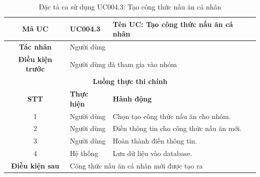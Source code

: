 \begin{table}[H]
    \centering
    \label{tab:uc004-3}
    \begin{tabularx}{\textwidth}{|c|p{3.5cm}|X|}
        \hline
        \rowcolor{headergreen} 
        \textbf{Mã UC} & \textbf{UC004.3} & \textbf{Tên UC: Tạo công thức nấu ăn cá nhân} \\ \hline
        \textbf{Tác nhân} & \multicolumn{2}{l|}{Người dùng} \\ \hline
        \textbf{Điều kiện trước} & \multicolumn{2}{X|}{Người dùng đã tham gia vào nhóm} \\ \hline
        
        \multicolumn{3}{|c|}{\cellcolor{headerorange}\textbf{Luồng thực thi chính}} \\ \hline
        \rowcolor{graybg} \textbf{STT} & \textbf{Thực hiện} & \textbf{Hành động} \\ \hline
        1 & Người dùng & Chọn tạo công thức nấu ăn cho nhóm. \\ \hline
        2 & Người dùng & Điền thông tin cho công thức nấu ăn mới. \\ \hline
        3 & Người dùng & Hoàn thành điền thông tin. \\ \hline
        4 & Hệ thống & Lưu dữ liệu vào database. \\ \hline
        
        \textbf{Điều kiện sau} & \multicolumn{2}{X|}{Công thức nấu ăn cá nhân mới được tạo ra} \\ \hline
    \end{tabularx}
    \caption{Đặc tả ca sử dụng UC004.3: Tạo công thức nấu ăn cá nhân}
\end{table}

